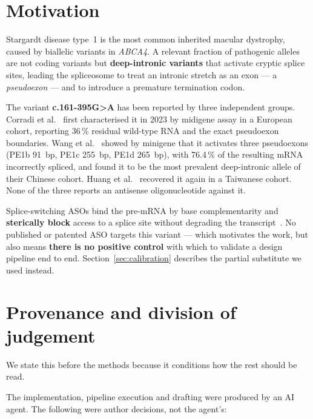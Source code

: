 \documentclass[11pt,a4paper]{article}
\begin{document}
\clearpage

\tableofcontents
\clearpage

\section{Motivation}

Stargardt disease type~1 is the most common inherited macular dystrophy, caused by biallelic
variants in \emph{ABCA4}. A relevant fraction of pathogenic alleles are not coding variants but
\textbf{deep-intronic variants} that activate cryptic splice sites, leading the spliceosome to
treat an intronic stretch as an exon --- a \emph{pseudoexon} --- and to introduce a premature
termination codon.

The variant \textbf{c.161-395G>A} has been reported by three independent groups. Corradi et
al.~\cite{corradi2023} first characterised it in 2023 by midigene assay in a European cohort,
reporting 36\,\% residual wild-type RNA and the exact pseudoexon boundaries. Wang et
al.~\cite{wang2025} showed by minigene that it activates three pseudoexons (PE1b 91~bp, PE1c
255~bp, PE1d 265~bp), with 76.4\,\% of the resulting mRNA incorrectly spliced, and found it to be
the most prevalent deep-intronic allele of their Chinese cohort. Huang et al.~\cite{huang2025}
recovered it again in a Taiwanese cohort. None of the three reports an antisense oligonucleotide
against it.

Splice-switching ASOs bind the pre-mRNA by base complementarity and \textbf{sterically block}
access to a splice site without degrading the transcript~\cite{dhuri2020}. No published or patented
ASO targets this variant --- which motivates the work, but also means \textbf{there is no positive
control} with which to validate a design pipeline end to end. Section~\ref{sec:calibration}
describes the partial substitute we used instead.

\section{Provenance and division of judgement}
\label{sec:provenance}

We state this before the methods because it conditions how the rest should be read.

The implementation, pipeline execution and drafting were produced by an AI agent. The following
were author decisions, not the agent's:
\end{document}

